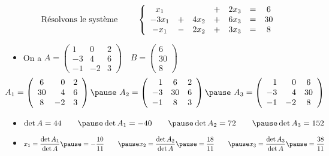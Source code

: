 \begin{frame}
\begin{exemple}
 \vspace{-5pt}\[\text{Résolvons le système  \qquad }\left\{ 
\begin{array}{ccccccc}
x_1 & && + &2x_3 & = &6\\
 -3x_1 &+ &4x_2 &+ &6x_3 & = & 30\\
 -x_1 &- &2x_2 &+ &3 x_3 & = & 8 \end{array}
\right. \]\vspace{-7pt}
\begin{itemize}
  \item\pause On a  
$
A = \left(
\begin{array}{rrc}
1 & 0 & 2\\
-3 & 4 & 6\\
-1 & -2 & 3
\end{array}\right)
\quad
B = \left(
\begin{array}{c} 6 \\ 30 \\ 8 \end{array}\right)
$
\pause
\[
\hspace{-23pt}
A_1 = \left(
\begin{array}{crc}
6 & 0 & 2\\
30 & 4 & 6\\
8 & -2 & 3
\end{array}\right) \pause
\  A_2 = \left(
\begin{array}{rcc}
1 & 6 & 2\\
-3 & 30 & 6\\
-1 & 8 & 3
\end{array}\right) \pause
\  A_3 = \left(
\begin{array}{rrc}
1 & 0 & 6\\
-3 & 4 & 30\\
-1 & -2 & 8
\end{array}\right)
\] \vspace{-7pt}
\item\pause $\det A  =  44 \qquad \pause \det A_1  =  -40 \qquad  \pause
\det A_2  =  72 \qquad \pause \det A_3  =  152$
\smallskip
\item\pause $\displaystyle
x_1 = \frac{\det A_1}{\det A} \pause = -\frac{10}{11}\qquad \pause
x_2 = \frac{\det A_2}{\det A} \pause = \frac{18}{11}\qquad \pause
x_3 = \frac{\det A_3}{\det A} \pause = \frac{38}{11} 
$
\end{itemize}
\end{exemple}
\end{frame}

